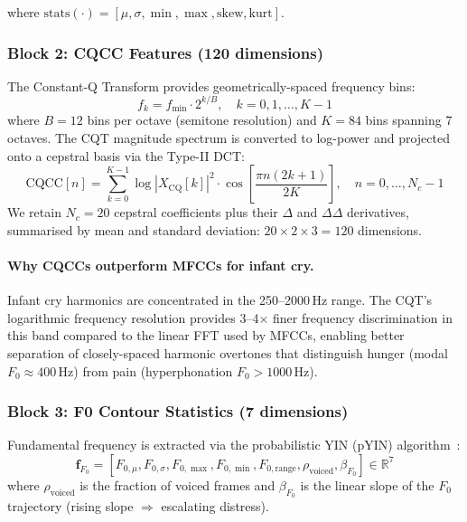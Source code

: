 \documentclass[11pt,a4paper]{article}
\begin{document}
\noindent
where $\text{stats}(\cdot) = [\mu, \sigma, \min, \max, \text{skew}, \text{kurt}]$.

\subsubsection{Block 2: CQCC Features (120 dimensions)}

The Constant-Q Transform provides geometrically-spaced frequency bins:
\begin{equation}
  f_k = f_{\min} \cdot 2^{k / B}, \quad k = 0, 1, \dots, K-1
\end{equation}
where $B = 12$ bins per octave (semitone resolution) and $K = 84$
bins spanning 7 octaves. The CQT magnitude spectrum is converted to
log-power and projected onto a cepstral basis via the Type-II DCT:
\begin{equation}
  \text{CQCC}[n] = \sum_{k=0}^{K-1} \log|X_{\text{CQ}}[k]|^2 \cdot
    \cos\!\left[\frac{\pi n (2k+1)}{2K}\right], \quad n = 0, \dots, N_c - 1
\end{equation}
We retain $N_c = 20$ cepstral coefficients plus their $\Delta$ and
$\Delta\Delta$ derivatives, summarised by mean and standard deviation:
$20 \times 2 \times 3 = 120$ dimensions.

\paragraph{Why CQCCs outperform MFCCs for infant cry.}
Infant cry harmonics are concentrated in the 250--2000\,Hz range.
The CQT's logarithmic frequency resolution provides 3--4$\times$ finer
frequency discrimination in this band compared to the linear FFT used
by MFCCs, enabling better separation of closely-spaced harmonic
overtones that distinguish hunger (modal $F_0 \approx 400$\,Hz) from
pain (hyperphonation $F_0 > 1000$\,Hz).

\subsubsection{Block 3: F0 Contour Statistics (7 dimensions)}

Fundamental frequency is extracted via the probabilistic YIN
(pYIN) algorithm~\cite{mauch2014pyin}:
\begin{equation}
  \mathbf{f}_{F_0} = [F_{0,\mu}, F_{0,\sigma}, F_{0,\max}, F_{0,\min},
                       F_{0,\text{range}}, \rho_{\text{voiced}},
                       \beta_{F_0}] \in \mathbb{R}^7
\end{equation}
where $\rho_{\text{voiced}}$ is the fraction of voiced frames and
$\beta_{F_0}$ is the linear slope of the $F_0$ trajectory (rising
slope $\Rightarrow$ escalating distress).
\end{document}
